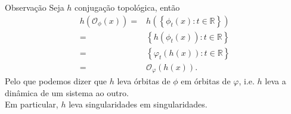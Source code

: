 \begin{frame}{}
  \begin{block}{Observação}
    Seja $h$ conjugação topológica, então
    \begin{align*}
      h\left( \mathcal{O}_{\phi}(x) \right)=&h\left( \left\{ \phi_t(x):t\in\mathbb{R} \right\} \right)\\
      =&\left\{ h(\phi_t(x)):t\in\mathbb{R} \right\}\\
      =&\left\{ \varphi_t(h(x)):t\in\mathbb{R} \right\}\\
      =&\mathcal{O}_{\varphi}(h(x)). 
    \end{align*}
    Pelo que podemos dizer que $h$ leva órbitas de $\phi$ em órbitas de $\varphi$, i.e. $h$ leva a dinâmica de um sistema ao outro.\\
    Em particular, $h$ leva singularidades em singularidades. 
  \end{block}
\end{frame}
